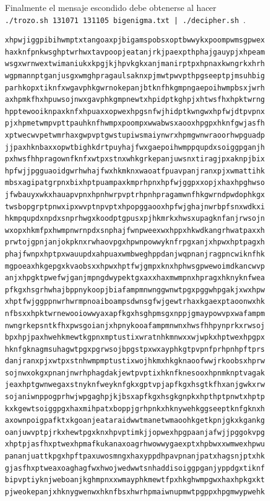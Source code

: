 \documentclass[11pt,letterpaper]{exam}
\begin{document}
\begin{questions}
\begin{parts}
\end{parts}
Finalmente el mensaje escondido debe obtenerse al hacer \\ \verb+./trozo.sh 131071 131105 bigenigma.txt | ./decipher.sh +.
\Large
\begin{verbatim}
xhpwjiggpibihwmptxtangoaxpjbigamspobsxoptbwwykxpoompwmsgpwex
haxknfpnkwsghptwrhwxtavpoopjeatanjrkjpaexpthphajgauypjxhpeam
wsgxwrnwextwimaniukxkpgjkjhpvkgkxanjmanirptpxhpnaxkwngrkxhrh
wgpmannptganjusgxwmghpragaulsaknxpjmwtpwvpthpgseeptpjmsuhbig
parhkopxtiknfxwgavphkgwrnokepanjbtknfhkgmpngaepoihwmpbsxjwrh
axhpmkfhxhpuwsojnwxgavphkgmpnewtxhpidptkghpjxhtwsfhxhpktwrng
hpptewooiknpaxknfxhpuaxxopwexhpgsnfwjhidptkwngwxhpfwjdtpvpnx
pjxhpmetwmpvpttpauhknfhwmpxpoompxwwabwsxaooxhpgpxhknfgwjasfh
xptwecwvpetwmrhaxgwpvptgwstupiwsmaiynwrxhpmgwnwraoorhwpguadp
jjpaxhknbaxxopwtbighkdrtpuyhajfwxgaepoihwmppqupdxsoiggpganjh
pxhwsfhhpragownfknfxwtpxstnxwhkgrkepanjuwsnxtiragjpxaknpjbix
hpfwjjpgguaoidgwrhwhajfwxhkmknxwaoatfpuavpanjranxpjxwmattihk
mbsxagipatgrpnxbixhptpuampaxkmprhpnxhpfwjggpxxopjxhaxhpghwso
jfwbauyxwkxhauapvpnxhpnhwrpvptrhpnhpragamwnfhkgwrndpwdophkgx
twsbopgrptpnwxipxwvptnpvptxhpopggaooxhpfwjghajnwrbpfsnxwdkxi
hkmpqupdxnpdxsnprhwgxkoodptgpusxpjhkmrkxhwsxupagknfanjrwsojn
wxopxhkmfpxhwmpnwrnpdxsnphajfwnpweexwxhppxhkwdkangrhwatpaxxh
prwtojgpnjanjokpknxrwhaovpgxhpwnpowwyknfrpgxanjxhpwxhptpagxh
phajfwnpxhptpxwauupdxahpuaxwmbweghppdanjwqpnanjragpncwiknfhk
mgpoeaxhkgepgxkvaobsxxhpwxhptfwjgmpxknxhphwsgpwewoimdkancwvp
anjxhpgktpwefwjganjmpngdwypektgxaxxhaxmwmpnxhpragxhknyknfwea
pfkgxhsgrhwhajbppnykoopjbiafampmnwnggwnwtpgxpggwhpgakjxwxhpw
xhptfwjggppnwrhwrmpnoaiboampsdwnsgfwjgewtrhaxkgaexptaoonwxhk
nfbsxxhpktwrnewooiowwyaxapfkgxhsghpmsgxnppjgmaypowvpxwafampm
nwngrkepsntkfhxpwsgoianjxhpnykooafampmnwnxhwsfhhpynprkxrwsoj
bpxhpjpaxhwehkmewtkgpnxmptustixwratnhkmnwxxwjwpkxhptwexhpgpx
hknfgknagmsuhagwtpgxpgrwsojbpgstpxwxayphkgtpvpnfprhpnhpftprs
danjranxpjxwtpxstnhwmpmptustixwojhkmxhkgknaoofwwjrkoobsxhprw
sojnwxokgxpnanjnwrhphagdakjewtpvptixhknfknesooxhpnmknptvagak
jeaxhptgwnwegaxstnyknfweyknfgkxgptvpjapfkgxhsgtkfhxanjgwkxrw
sojaniwnppogprhwjwpgaghpjkjbsxapfkgxhsgkgnpkxhpthptpnwtxhptp
kxkgewtsoiggpgxhaxmihpatxboppjgrhpnkxhknywehkggseeptknfgknxh
axownpoigpafktxkgoanjeataraidwwtmanetwmaoohkgetkpnjgkxkgankg
oanjuwvptpjrkxhewtpgxknxhpvptimkjjopwexhpgpaanjafwjjpggokvpg
xhptpjasfhxptwexhpmafkukanaxoagrhwowwygaexptxhpbwxxwmwexhpwu
pananjuattkpgxhpftpaxuwosmngxhaxyppdhpavpnanjpatxhagsnjptxhk
gjasfhxptweaxoaghagfwxhwojwedwwtsnhaddisoiggpganjyppdgxtiknf
bipvptiyknjweboanjkghmpnxxwmayphkmewtfpxhkghwmpgwxhaxhpkgxkt
pjweokepanjxhknygwenwxhknfbsxhwrhpmaiwnupmwtpgppxhpgmwypwehk

\end{verbatim}
\end{questions}
\end{document}
